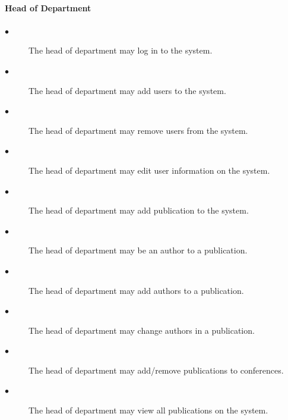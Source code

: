 \documentclass[a4paper]{article}
\begin{document}
	\paragraph{\textbf{Head of Department}}
	\begin{description}
		\item[$\bullet$] The head of department may log in to the system.
		\item[$\bullet$] The head of department may add users to the system.
		\item[$\bullet$] The head of department may remove users from the system.
		\item[$\bullet$] The head of department may edit user information on the system.
		\item[$\bullet$] The head of department may add publication to the system.
		\item[$\bullet$] The head of department may be an author to a publication.
		\item[$\bullet$] The head of department may add authors to a publication.
		\item[$\bullet$] The head of department may change authors in a publication.
		\item[$\bullet$] The head of department may add/remove publications to conferences.
		\item[$\bullet$] The head of department may view all publications on the system.
	\end{description}
\end{document}
